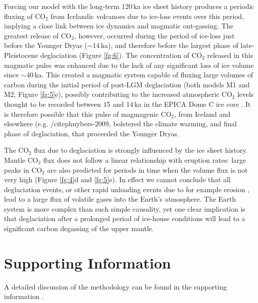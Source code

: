 \documentclass[draft,linenumbers]{agujournal2018}
\begin{document}
Forcing our model with the long-term 120\,ka ice sheet history produces a periodic fluxing of CO$_{2}$ from Icelandic volcanoes due to ice-loss events over this period, implying a close link between ice dynamics and magmatic out-gassing. The greatest release of CO$_{2}$, however, occurred during the period of ice-loss just before the Younger Dryas ($\sim$14\,ka), and therefore before the largest phase of late-Pleistocene deglaciation (Figure \ref{fg:6}). The concentration of CO$_{2}$ released in this magmatic pulse was enhanced due to the lack of any significant loss of ice volume since $\sim$40\,ka. This created a magmatic system capable of fluxing large volumes of carbon during the initial period of post-LGM deglaciation (both models M1 and M2, Figure \ref{fg:5}e), possibly contributing to the increased atmospheric CO$_{2}$ levels thought to be recorded between 15 and 14\,ka in the EPICA Dome C ice core \citep{kohler-etal-2011}. It is therefore possible that this pulse of magmagenic CO$_{2}$, from Iceland and elsewhere (e.g. /citep{huybers-2009},  bolstered the climate warming, and final phase of deglaciation, that proceeded the Younger Dryas.

The CO$_{2}$ flux due to deglaciation is strongly influenced by the ice sheet history. Mantle CO$_{2}$ flux does not follow a linear relationship with eruption rates: large peaks in CO$_{2}$ are also predicted for periods in time when the volume flux is not very high (Figure \ref{fg:4}d and \ref{fg:5}e). In effect we cannot conclude that all deglaciation events, or other rapid unloading events due to for example erosion \citep[e.g.][]{sternai-etal-2016}, lead to a large flux of volatile gases into the Earth’s atmosphere. The Earth system is more complex than such simple causality, yet one clear implication is that deglaciation after a prolonged period of ice-house conditions will lead to a significant carbon degassing of the upper mantle.

\section*{Supporting Information}

A detailed discussion of the methodology can be found in the supporting information \citep{andersen-etal-2004,andrews-2008,armitage-etal-g3-2011,clark-etal-2009,geirsdottir-2011,gibson-2010,gurenko-1995,katz-etal-2003,lambeck-2001,lambeck-etal-2014,mckenzie-1991,miller-etal-2014,ribe-1985,scott-1992,shorttle-2011,silbeck-1975,sleep-1976,spiegelman-1996,spratt-2016}.
\end{document}
